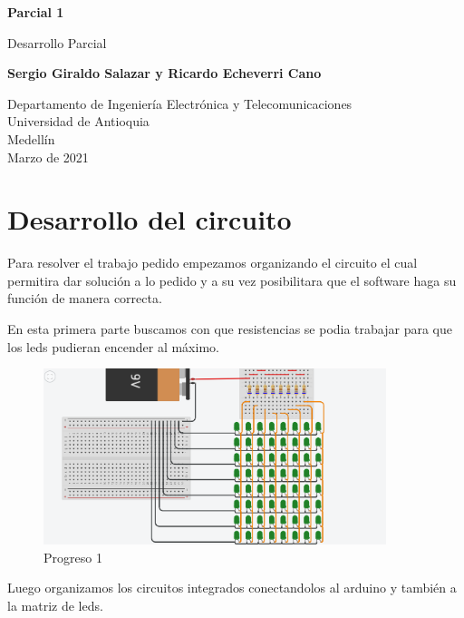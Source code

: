\documentclass{article}
\begin{document}
\begin{titlepage}
    \begin{center}
        \vspace*{1cm}
            
        \Huge
        \textbf{Parcial 1}
            
        \vspace{0.5cm}
        \LARGE
        Desarrollo Parcial
            
        \vspace{1.5cm}
            
        \textbf{Sergio Giraldo Salazar y Ricardo Echeverri Cano}
            
        \vfill
            
        \vspace{0.8cm}
            
        \Large
        Departamento de Ingeniería Electrónica y Telecomunicaciones\\
        Universidad de Antioquia\\
        Medellín\\
        Marzo de 2021
            
    \end{center}
\end{titlepage}

\tableofcontents
\newpage
\section{Desarrollo del circuito}\label{Circuito}
Para resolver el trabajo pedido empezamos organizando el circuito el cual permitira dar solución a lo pedido y a su vez posibilitara que el software haga su función de manera correcta.

En esta primera parte buscamos con que resistencias se podia trabajar para que los leds pudieran encender al máximo.

\begin{figure}[h]
\includegraphics[width=10cm]{1.png}
\centering
\caption{Progreso 1}
\label{fig:primeros pasos}
\end{figure}
Luego organizamos los circuitos integrados conectandolos al arduino y también a la matriz de leds.
\end{document}
